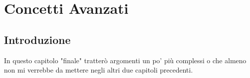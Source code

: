 
\chapter{Concetti Avanzati}















\section{Introduzione}

\textsf{\small In questo capitolo "finale" tratterò argomenti un po' più complessi o che almeno non mi verrebbe da mettere negli altri due capitoli precedenti.} \\

